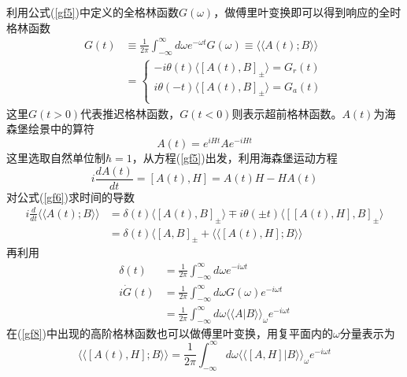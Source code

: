  利用公式(\ref{gf5})中定义的全格林函数$G(\omega)$，做傅里叶变换即可以得到响应的全时格林函数
\begin{equation}
\begin{aligned}
G(t)&\equiv\frac{1}{2\pi}\int_{-\infty}^{\infty}d\omega e^{-\omega t}G(\omega)\equiv\langle\langle A(t);B\rangle\rangle\\
&=\left\{
\begin{array}{cc}
-i\theta(t)\langle \left[A(t),B\right]_\pm\rangle=G_r(t)\\
i\theta(-t)\langle \left[A(t),B\right]_\pm\rangle=G_a(t)\\
\end{array}
\right.\label{gf6}
\end{aligned}
\end{equation}
这里$G(t>0)$代表推迟格林函数，$G(t<0)$则表示超前格林函数。$A(t)$为海森堡绘景中的算符
\begin{equation}
A(t)=e^{iHt}Ae^{-iHt}\label{hs1}
\end{equation}
这里选取自然单位制$\hbar=1$，从方程(\ref{gf5})出发，利用海森堡运动方程
\begin{equation}
i\frac{dA(t)}{dt}=\left[A(t),H\right]=A(t)H-HA(t)
\end{equation}
对公式(\ref{gf6})求时间的导数
\begin{equation}
\begin{aligned}
i\frac{d}{dt}\langle\langle A(t);B\rangle\rangle&=\delta(t)\langle \left[A(t),B\right]_\pm\rangle\mp i\theta(\pm t)\langle\left[\left[A(t),H\right],B\right]_\pm\rangle\\
&=\delta(t)\langle\left[A,B\right]_\pm+\langle\langle\left[A(t),H\right];B\rangle\rangle\label{gf7}
\end{aligned}
\end{equation}
再利用
\begin{equation}
\begin{aligned}
\delta(t)&=\frac{1}{2\pi}\int_{-\infty}^{\infty}d\omega e^{-i\omega t}\\
i\dot{G}(t)&=\frac{1}{2\pi}\int_{-\infty}^{\infty}d\omega G(\omega)e^{-i\omega t}\\
&=\frac{1}{2\pi}\int_{-\infty}^{\infty}d\omega \langle\langle A|B\rangle\rangle_\omega e^{-i\omega t}\label{gf8}
\end{aligned}
\end{equation}
在(\ref{gf8})中出现的高阶格林函数也可以做傅里叶变换，用复平面内的$\omega$分量表示为
\begin{equation}
\langle\langle\left[A(t),H\right];B\rangle\rangle=\frac{1}{2\pi}\int_{-\infty}^{\infty}d\omega \langle\langle\left[A,H\right]|B\rangle\rangle_\omega e^{-i\omega t}\label{gf9}
\end{equation}

